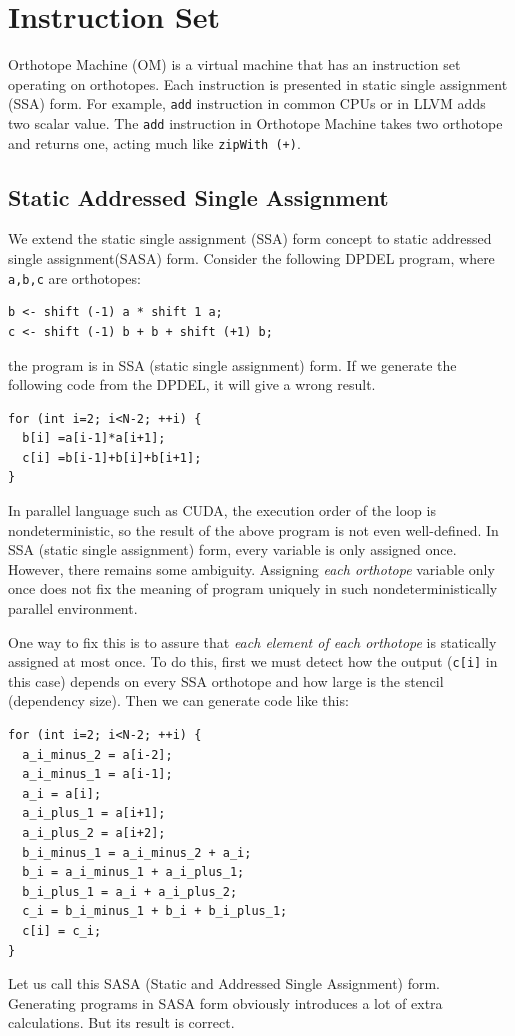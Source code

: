 \documentclass[twocolumn]{article}
\begin{document}
\section{Instruction Set}

Orthotope Machine (OM) is a virtual machine that has an instruction set
operating on orthotopes. Each instruction is presented in static single
assignment (SSA) form. For example, {\tt add} instruction in common CPUs or in
LLVM adds two scalar value. The {\tt add} instruction in Orthotope Machine
takes two orthotope and returns one, acting much like {\tt zipWith (+)}.

\subsection{Static Addressed Single Assignment}

We extend the static single assignment (SSA) form concept to static addressed
single assignment(SASA) form.  Consider the following DPDEL program, where
{\tt a,b,c} are orthotopes:
\begin{verbatim}
b <- shift (-1) a * shift 1 a;
c <- shift (-1) b + b + shift (+1) b;
\end{verbatim}
the program is in SSA (static single assignment) form.
If we generate the following code from the DPDEL, it will give a wrong result.
\begin{verbatim}
for (int i=2; i<N-2; ++i) {
  b[i] =a[i-1]*a[i+1];
  c[i] =b[i-1]+b[i]+b[i+1];
}
\end{verbatim}
In parallel language such as CUDA, the execution order of the loop is
nondeterministic, so the result of the above program is not even
well-defined. In SSA (static single assignment) form, every variable is only
assigned once. However, there remains some ambiguity.  Assigning {\em each
  orthotope} variable only once does not fix the meaning of program uniquely
in such nondeterministically parallel environment.

One way to fix this is to assure that {\em each element of each orthotope} is
statically assigned at most once. To do this, first we must detect how the
output ({\tt c[i]} in this case) depends on every SSA orthotope and how large
is the stencil (dependency size). Then we can generate code like this:
\begin{verbatim}
for (int i=2; i<N-2; ++i) {
  a_i_minus_2 = a[i-2];
  a_i_minus_1 = a[i-1];
  a_i = a[i];
  a_i_plus_1 = a[i+1];
  a_i_plus_2 = a[i+2];
  b_i_minus_1 = a_i_minus_2 + a_i;
  b_i = a_i_minus_1 + a_i_plus_1;
  b_i_plus_1 = a_i + a_i_plus_2;
  c_i = b_i_minus_1 + b_i + b_i_plus_1;
  c[i] = c_i;
}
\end{verbatim}
Let us call this SASA (Static and Addressed Single Assignment)
form. Generating programs in SASA form obviously introduces a lot of extra
calculations. But its result is correct. 
\end{document}
